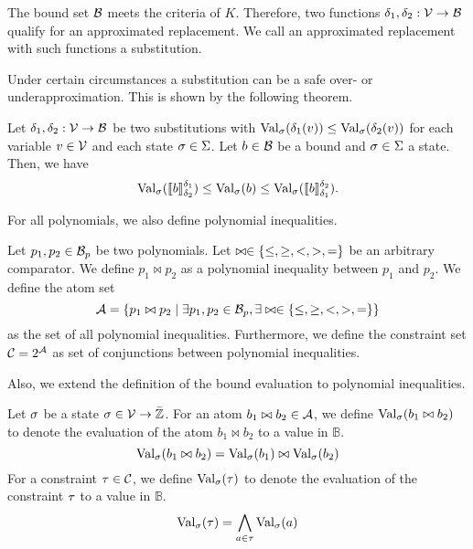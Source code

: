 The bound set $\mathcal{B}$ meets the criteria of $K$.
Therefore, two functions $\delta_1, \delta_2: \mathcal{V} \rightarrow \mathcal{B}$ qualify for an approximated replacement.
We call an approximated replacement with such functions a substitution.


Under certain circumstances a substitution can be a safe over- or underapproximation.
This is shown by the following theorem.

\begin{theorem}
  Let $\delta_1, \delta_2: \mathcal{V} \rightarrow \mathcal{B}$ be two substitutions with $\text{Val}_{\sigma}(\delta_1(v)) \leq \text{Val}_{\sigma}(\delta_2(v))$ for each variable $v \in \mathcal{V}$ and each state $\sigma \in \Sigma$.
  Let $b \in \mathcal{B}$ be a bound and $\sigma \in \Sigma$ a state.
  Then, we have
  \[ \text{Val}_{\sigma}(\llbracket b \rrbracket_{\delta_2}^{\delta_1}) \leq \text{Val}_{\sigma}(b) \leq \text{Val}_{\sigma}(\llbracket b \rrbracket_{\delta_1}^{\delta_2}). \]
\end{theorem}
For all polynomials, we also define polynomial inequalities.

\begin{definition}
  Let $p_1, p_2 \in \mathcal{B}_p$ be two polynomials.
  Let $\bowtie \in \lbrace \leq, \geq, <, >, = \rbrace$ be an arbitrary comparator.
  We define $p_1 \bowtie p_2$ as a polynomial inequality between $p_1$ and $p_2$.
  We define the atom set
  \[ \mathcal{A} = \lbrace p_1 \bowtie p_2 \mid \exists p_1, p_2 \in \mathcal{B}_p, \exists \bowtie \in \lbrace \leq, \geq, <, >, = \rbrace \rbrace \]
  as the set of all polynomial inequalities.
  Furthermore, we define the constraint set $\mathcal{C} = 2^{\mathcal{A}}$ as set of conjunctions between polynomial inequalities.
\end{definition}
Also, we extend the definition of the bound evaluation to polynomial inequalities.

\begin{definition}
  Let $\sigma$ be a state $\sigma \in \mathcal{V} \rightarrow \bar{\mathbb{Z}}$.
  For an atom $b_1 \bowtie b_2 \in \mathcal{A}$, we define $\text{Val}_{\sigma}(b_1 \bowtie b_2)$ to denote the evaluation of the atom $b_1 \bowtie b_2$ to a value in $\mathbb{B}$.
  \[ \text{Val}_{\sigma}(b_1 \bowtie b_2) = \text{Val}_{\sigma}(b_1) \bowtie \text{Val}_{\sigma}(b_2) \]
  For a constraint $\tau \in \mathcal{C}$, we define $\text{Val}_{\sigma}(\tau)$ to denote the evaluation of the constraint $\tau$ to a value in $\mathbb{B}$.
  \[ \text{Val}_{\sigma}(\tau) = \bigwedge_{a \in \tau} \text{Val}_{\sigma}(a) \]
\end{definition}
